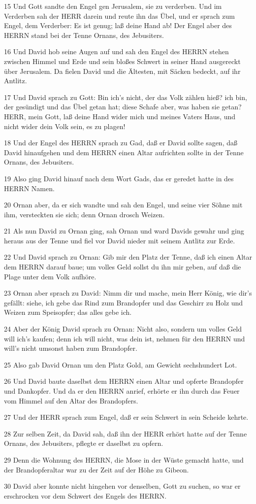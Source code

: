 \par 15 Und Gott sandte den Engel gen Jerusalem, sie zu verderben. Und im Verderben sah der HERR darein und reute ihn das Übel, und er sprach zum Engel, dem Verderber: Es ist genug; laß deine Hand ab! Der Engel aber des HERRN stand bei der Tenne Ornans, des Jebusiters.
\par 16 Und David hob seine Augen auf und sah den Engel des HERRN stehen zwischen Himmel und Erde und sein bloßes Schwert in seiner Hand ausgereckt über Jerusalem. Da fielen David und die Ältesten, mit Säcken bedeckt, auf ihr Antlitz.
\par 17 Und David sprach zu Gott: Bin ich's nicht, der das Volk zählen hieß? ich bin, der gesündigt und das Übel getan hat; diese Schafe aber, was haben sie getan? HERR, mein Gott, laß deine Hand wider mich und meines Vaters Haus, und nicht wider dein Volk sein, es zu plagen!
\par 18 Und der Engel des HERRN sprach zu Gad, daß er David sollte sagen, daß David hinaufgehen und dem HERRN einen Altar aufrichten sollte in der Tenne Ornans, des Jebusiters.
\par 19 Also ging David hinauf nach dem Wort Gads, das er geredet hatte in des HERRN Namen.
\par 20 Ornan aber, da er sich wandte und sah den Engel, und seine vier Söhne mit ihm, versteckten sie sich; denn Ornan drosch Weizen.
\par 21 Als nun David zu Ornan ging, sah Ornan und ward Davids gewahr und ging heraus aus der Tenne und fiel vor David nieder mit seinem Antlitz zur Erde.
\par 22 Und David sprach zu Ornan: Gib mir den Platz der Tenne, daß ich einen Altar dem HERRN darauf baue; um volles Geld sollst du ihn mir geben, auf daß die Plage unter dem Volk aufhöre.
\par 23 Ornan aber sprach zu David: Nimm dir und mache, mein Herr König, wie dir's gefällt: siehe, ich gebe das Rind zum Brandopfer und das Geschirr zu Holz und Weizen zum Speisopfer; das alles gebe ich.
\par 24 Aber der König David sprach zu Ornan: Nicht also, sondern um volles Geld will ich's kaufen; denn ich will nicht, was dein ist, nehmen für den HERRN und will's nicht umsonst haben zum Brandopfer.
\par 25 Also gab David Ornan um den Platz Gold, am Gewicht sechshundert Lot.
\par 26 Und David baute daselbst dem HERRN einen Altar und opferte Brandopfer und Dankopfer. Und da er den HERRN anrief, erhörte er ihn durch das Feuer vom Himmel auf den Altar des Brandopfers.
\par 27 Und der HERR sprach zum Engel, daß er sein Schwert in sein Scheide kehrte.
\par 28 Zur selben Zeit, da David sah, daß ihn der HERR erhört hatte auf der Tenne Ornans, des Jebusiters, pflegte er daselbst zu opfern.
\par 29 Denn die Wohnung des HERRN, die Mose in der Wüste gemacht hatte, und der Brandopferaltar war zu der Zeit auf der Höhe zu Gibeon.
\par 30 David aber konnte nicht hingehen vor denselben, Gott zu suchen, so war er erschrocken vor dem Schwert des Engels des HERRN.

